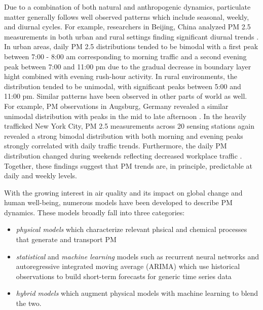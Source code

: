 Due to a combination of both natural and anthropogenic dynamics, particulate
matter generally follows well observed patterns which include seasonal, weekly,
and diurnal cycles. For example, researchers in Beijing, China analyzed PM 2.5
measurements in both urban and rural settings finding significant diurnal
trends \cite{pm-patterns-china}. In urban areas, daily PM 2.5 distributions
tended to be bimodal with a first peak between 7:00 - 8:00 am corresponding to
morning traffic and a second evening peak between 7:00 and 11:00 pm due to the
gradual decrease in boundary layer hight combined with evening rush-hour
activity. In rural environments, the distribution tended to be unimodal, with
significant peaks between 5:00 and 11:00 pm. Similar patterns have been observed
in other parts of world as well. For example, PM observations in Augsburg,
Germany revealed a similar unimodal distribution with peaks in the mid to late
afternoon \cite{pm-patterns-germany}. In the heavily trafficked New York City,
PM 2.5 measurements across 20 sensing stations again revealed a strong bimodal
distribution with both morning and evening peaks strongly correlated with daily
traffic trends. Furthermore, the daily PM distribution changed during weekends
reflecting decreased workplace traffic \cite{pm-patterns-nyc}. Together, these
findings suggest that PM trends are, in principle, predictable at daily and
weekly levels.

With the growing interest in air quality and its impact on global change and
human well-being, numerous models have been developed to describe PM dynamics.
These models broadly fall into three categories:
\begin{itemize}
  \item \textit{physical models} which characterize relevant phsical and
    chemical processes that generate and transport PM
  \item \textit{statistical} and \textit{machine learning} models such as recurrent neural networks and autoregressive
    integrated moving average (ARIMA) which use historical observations to build
    short-term forecasts for generic time series data
  \item \textit{hybrid models} which augment physical models with machine
    learning to blend the two.
\end{itemize}

